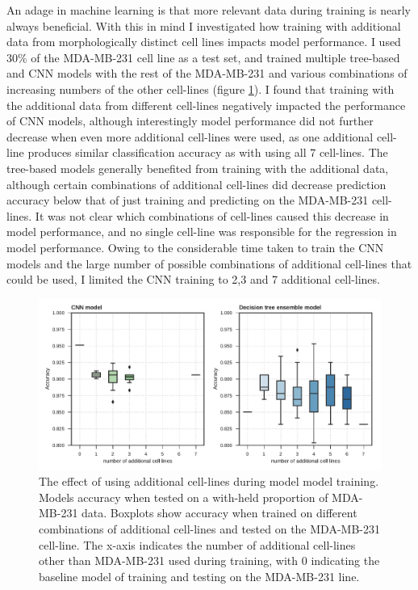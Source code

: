 \documentclass[a4paper,11pt,twoside,openright]{scrbook}
\begin{document}
An adage in machine learning is that more relevant data during training is nearly always beneficial.
With this in mind I investigated how training with additional data from morphologically distinct cell lines impacts 
model performance.
I used 30\% of the MDA-MB-231 cell line as a test set, and trained multiple tree-based and CNN models with the rest of 
the MDA-MB-231 and various combinations of increasing numbers of the other cell-lines (figure 
\ref{figure:cumulative_training}).
I found that training with the additional data from different cell-lines negatively impacted the performance of CNN 
models, although interestingly model performance did not further decrease when even more additional cell-lines were 
used, as one additional cell-line produces similar classification accuracy as with using all 7 cell-lines.
The tree-based models generally benefited from training with the additional data, although certain combinations of 
additional cell-lines did decrease prediction accuracy below that of just training and predicting on the MDA-MB-231 
cell-lines.
It was not clear which combinations of cell-lines caused this decrease in model performance, and no single cell-line 
was responsible for the regression in model performance.
Owing to the considerable time taken to train the CNN models and the large number of possible combinations of 
additional cell-lines that could be used, I limited the CNN training to 2,3 and 7 additional cell-lines.


\begin{figure}
    \includegraphics[width=1.0\textwidth]{ch2CumulativeTraining}
    \captionsetup{width=0.8\textwidth}
    \caption[The effect of using additional cell-lines during model training]{
        The effect of using additional cell-lines during model model training.
        Models accuracy when tested on a with-held proportion of MDA-MB-231 data.
        Boxplots show accuracy when trained on different combinations of additional cell-lines and tested on the 
MDA-MB-231 cell-line.
        The x-axis indicates the number of additional cell-lines other than MDA-MB-231 used during training, with 0 
indicating the baseline model of training and testing on the MDA-MB-231 line.
    }
    \label{figure:cumulative_training}
\end{figure}
\end{document}
